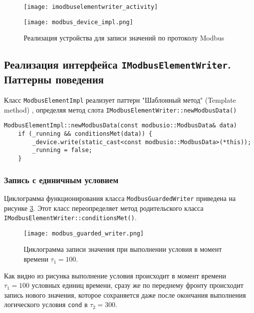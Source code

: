 \begin{center}
    \begin{figure}
        \texttt{[image: imodbuselementwriter\_activity]}
        \caption{}\label{fig:imodbuselementwriter_activity}
    \end{figure}
\end{center}

\begin{center}
    \begin{figure}
        \texttt{[image: modbus\_device\_impl.png]}
        \caption{Реализация устройства для записи значений по протоколу Modbus}\label{fig:modbus_device_imp}
    \end{figure}
\end{center}


\subsection{Реализация интерфейса \texttt{IModbusElementWriter}. Паттерны поведения}
Класс \texttt{ModbusElementImpl} реализует паттерн "Шаблонный метод" (Template method) \cite{book:pattern:band_of_4},
определяя метод слота \texttt{IModbusElementWriter::newModbusData()}
\begin{lstlisting}
ModbusElementImpl::newModbusData(const modbusio::ModbusData& data)
    if (_running && conditionsMet(data)) {
        _device.write(static_cast<const modbusio::ModbusData>(*this));
        _running = false;
    }
\end{lstlisting}


\subsubsection{Запись с единичным условием}
Циклограмма функционирования класса \texttt{ModbusGuardedWriter} приведена на рисунке \ref{fig:modbus_guarded_writed}.
Этот класс переопределяет метод родительского класса \texttt{IModbusElementWriter::conditionsMet()}.
\begin{center}
    \begin{figure}[h!]
        \texttt{[image: modbus\_guarded\_writer.png]}
        \caption{Циклограмма записи значения при выполнении условия в момент времени $\tau_1=100$.}\label{fig:modbus_guarded_writed}
    \end{figure}
\end{center}
Как видно из рисунка выполнение условия происходит в момент времени $\tau_1=100$ условных единиц времени,
сразу же по переднему фронту происходит запись нового значения, которое сохраняется даже после окончания
выполнения логического условия \texttt{cond} в $\tau_2=300$.


